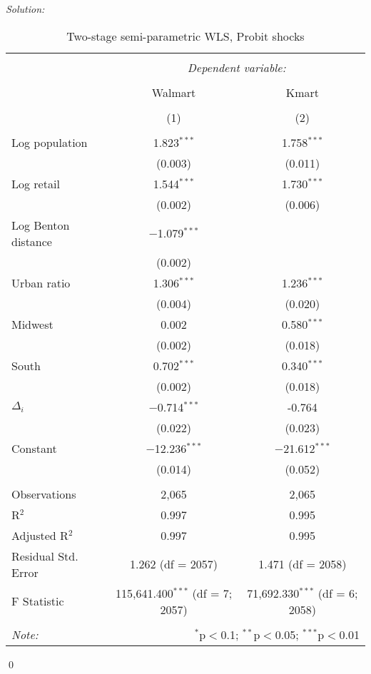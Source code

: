 \documentclass[12pt]{article}
\newenvironment{sol}
    {\emph{Solution:}
    }
    {
    \qed
    }
\begin{document}
\begin{sol}
\begin{table}[!htbp]
    \caption{Two-stage semi-parametric WLS, Probit shocks} 
    \label{} 
  \begin{tabular}{@{\extracolsep{5pt}}lcc} 
  \\[-1.8ex]\hline 
  \hline \\[-1.8ex] 
   & \multicolumn{2}{c}{\textit{Dependent variable:}} \\ 
  \cline{2-3} 
  \\[-1.8ex] & Walmart & Kmart \\ 
  \\[-1.8ex] & (1) & (2)\\ 
  \hline \\[-1.8ex] 
   Log population & 1.823$^{***}$ & 1.758$^{***}$ \\ 
    & (0.003) & (0.011) \\ 
   Log retail & 1.544$^{***}$ & 1.730$^{***}$ \\ 
    & (0.002) & (0.006) \\ 
   Log Benton distance & $-$1.079$^{***}$ &  \\ 
    & (0.002) &  \\ 
   Urban ratio & 1.306$^{***}$ & 1.236$^{***}$ \\ 
    & (0.004) & (0.020) \\ 
   Midwest & 0.002 & 0.580$^{***}$ \\ 
    & (0.002) & (0.018) \\ 
   South & 0.702$^{***}$ & 0.340$^{***}$ \\ 
    & (0.002) & (0.018) \\ 
   $\Delta_{i}$ & $-$0.714$^{***}$ & -0.764 \\ 
    & (0.022) & (0.023)  \\ 
   Constant & $-$12.236$^{***}$ & $-$21.612$^{***}$ \\ 
    & (0.014) & (0.052) \\ 
  \hline \\[-1.8ex] 
  Observations & 2,065 & 2,065 \\ 
  R$^{2}$ & 0.997 & 0.995 \\ 
  Adjusted R$^{2}$ & 0.997 & 0.995 \\ 
  Residual Std. Error & 1.262 (df = 2057) & 1.471 (df = 2058) \\ 
  F Statistic & 115,641.400$^{***}$ (df = 7; 2057) & 71,692.330$^{***}$ (df = 6; 2058) \\ 
  \hline 
  \hline \\[-1.8ex] 
  \textit{Note:}  & \multicolumn{2}{r}{$^{*}$p$<$0.1; $^{**}$p$<$0.05; $^{***}$p$<$0.01} \\ 
  \end{tabular} 
  \end{table} 



\end{sol}
\end{document}
